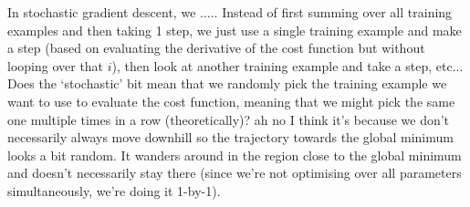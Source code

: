 \documentclass[a4paper, 10pt,hidelinks]{article}
\newcommand{\ind}[1]{^{(#1)}}
\begin{document}
In stochastic gradient descent, we ..... %
Instead of first summing over all training examples and then taking 1 step, we just use a single training example and make a step (based on evaluating the derivative of the cost function but without looping over that $i$), then look at another training example and take a step, etc... Does the `stochastic' bit mean that we randomly pick the training example we want to use to evaluate the cost function, meaning that we might pick the same one multiple times in a row (theoretically)? ah no I think it's because we don't necessarily always move downhill so the trajectory towards the global minimum looks a bit random. It wanders around in the region close to the global minimum and doesn't necessarily stay there (since we're not optimising over all parameters simultaneously, we're doing it 1-by-1). %
\end{document}
